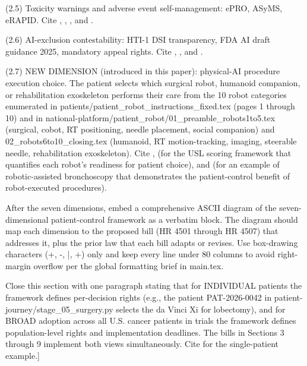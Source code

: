 (2.5) Toxicity warnings and adverse event self-management: ePRO,
ASyMS, eRAPID. Cite \cite{rocque2025remote_symptom_monitoring},
\cite{kearney2009asyms}, \cite{maguire2017esmart}, and
\cite{absolom2021erapid}.

(2.6) AI-exclusion contestability: HTI-1 DSI transparency, FDA AI
draft guidance 2025, mandatory appeal rights. Cite
\cite{rank9_onc_hti1_2023}, \cite{hti1_dsi_fact_sheet_2023}, and
\cite{fda_ai_regulatory_decision_draft_2025}.

(2.7) NEW DIMENSION (introduced in this paper): physical-AI procedure
execution choice. The patient selects which surgical robot, humanoid
companion, or rehabilitation exoskeleton performs their care from the
10 robot categories enumerated in
patients/patient\_robot\_instructions\_fixed.tex (pages 1 through 10) and
in national-platform/patient\_robot/01\_preamble\_robots1to5.tex
(surgical, cobot, RT positioning, needle placement, social companion)
and 02\_robots6to10\_closing.tex (humanoid, RT motion-tracking, imaging,
steerable needle, rehabilitation exoskeleton). Cite
\cite{kawchak_2026_18810541}, \cite{kawchak_2026_18778219} (for the
USL scoring framework that quantifies each robot's readiness for
patient choice), and \cite{target2025robotic_bronchoscopy} (for an
example of robotic-assisted bronchoscopy that demonstrates the
patient-control benefit of robot-executed procedures).

After the seven dimensions, embed a comprehensive ASCII diagram of the
seven-dimensional patient-control framework as a verbatim block. The
diagram should map each dimension to the proposed bill (HR 4501
through HR 4507) that addresses it, plus the prior law that each bill
adapts or revises. Use box-drawing characters (+, -, |, +) only and
keep every line under 80 columns to avoid right-margin overflow per
the global formatting brief in main.tex.

Close this section with one paragraph stating that for INDIVIDUAL
patients the framework defines per-decision rights (e.g., the patient
PAT-2026-0042 in patient-journey/stage\_05\_surgery.py selects the da
Vinci Xi for lobectomy), and for BROAD adoption across all U.S. cancer
patients in trials the framework defines population-level rights and
implementation deadlines. The bills in Sections 3 through 9 implement
both views simultaneously. Cite \cite{kawchak_2026_19119939} for the
single-patient example.]
